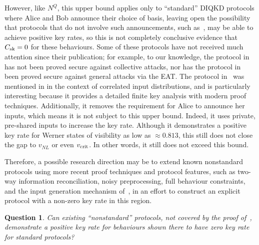 \documentclass[10pt, a4paper]{article}
\numberwithin{equation}{section} %
\theoremstyle{definition}
\theoremstyle{plain}
\newtheorem{question}{Question}
\newcommand{\?}{\mathrel{?}} %
\newcommand{\sk}{\rm sk}
\newcommand{\crit}{\rm crit}
\begin{document}
    However, like \(N^Q\), this upper bound applies only to ``standard'' DIQKD protocols where Alice and Bob announce their choice of basis, leaving open the possibility that protocols that do not involve such announcements, such as~\cites{NonstandardProtocol, DIQKD_MeasInputs}[Prot. 2]{DIQKD_FiniteSize}, may be able to achieve positive key rates, so this is not completely conclusive evidence that \(C_{\sk} = 0\) for these behaviours. Some of these protocols have not received much attention since their publication; for example, to our knowledge, the protocol in~\cite{NonstandardProtocol} has not been proved secure against collective attacks, nor has the protocol in~\cite{DIQKD_MeasInputs} been proved secure against general attacks via the EAT\@. The protocol in~\cite[Prot. 2]{DIQKD_FiniteSize} was mentioned in  in the context of correlated input distributions, and is particularly interesting because it provides a detailed finite key analysis with modern proof techniques. Additionally, it removes the requirement for Alice to announce her inputs, which means it is not subject to this upper bound. Indeed, it uses private, pre-shared inputs to increase the key rate. Although it demonstrates a positive key rate for Werner states of visibility as low as \(\approx 0.813\), this still does not close the gap to \(v_{NL}\) or even \(v_{\crit}\). In other words, it still does not exceed this bound.

    Therefore, a possible research direction may be to extend known nonstandard protocols using more recent proof techniques and protocol features, such as two-way information reconciliation, noisy preprocessing, full behaviour constraints, and the input generation mechanism of~\cite[Prot. 2]{DIQKD_FiniteSize}, in an effort to construct an explicit protocol with a non-zero key rate in this region.
    \begin{question}
      Can existing ``nonstandard'' protocols, not covered by the proof of~\cite{NotSufficient}, demonstrate a positive key rate for behaviours shown there to have zero key rate for standard protocols?
    \end{question}
\end{document}
